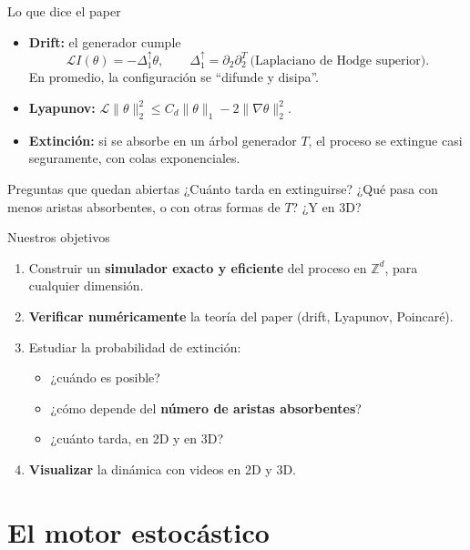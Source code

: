 \documentclass[aspectratio=169,11pt]{beamer}
\newcommand{\Z}{\mathbb{Z}}
\newcommand{\Lgen}{\mathcal{L}}
\newcommand{\norm}[1]{\lVert #1\rVert}
\begin{document}
\begin{frame}{Lo que dice el paper}
  \begin{itemize}
    \item \textbf{Drift:} el generador cumple
      \[
        \Lgen I(\theta)=-\Delta_1^{\uparrow}\theta,\qquad \Delta_1^\uparrow=\partial_2\partial_2^T \ \text{(Laplaciano de Hodge superior)}.
      \]
      En promedio, la configuración se ``difunde y disipa''.
    \item \textbf{Lyapunov:} $\Lgen\norm{\theta}_2^2\le C_d\norm{\theta}_1-2\norm{\nabla\theta}_2^2$.
    \item \textbf{Extinción:} si se absorbe en un \alert{árbol generador} $T$, el proceso se extingue casi seguramente, con colas exponenciales.
  \end{itemize}
  \vspace{2mm}
  \begin{block}{Preguntas que quedan abiertas}
    ¿Cuánto tarda en extinguirse? ¿Qué pasa con menos aristas absorbentes, o con otras formas de $T$? ¿Y en 3D?
  \end{block}
\end{frame}

\begin{frame}{Nuestros objetivos}
  \begin{enumerate}
    \item Construir un \textbf{simulador exacto y eficiente} del proceso en $\Z^d$, para cualquier dimensión.
    \item \textbf{Verificar numéricamente} la teoría del paper (drift, Lyapunov, Poincaré).
    \item Estudiar la \alert{probabilidad de extinción}:
      \begin{itemize}
        \item ¿cuándo es posible?
        \item ¿cómo depende del \textbf{número de aristas absorbentes}?
        \item ¿cuánto tarda, en 2D y en 3D?
      \end{itemize}
    \item \textbf{Visualizar} la dinámica con videos en 2D y 3D.
  \end{enumerate}
\end{frame}

\section{El motor estocástico}
\end{document}
